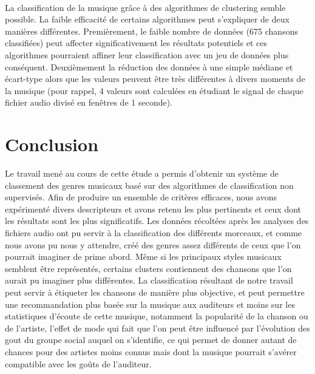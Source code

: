 \documentclass[soumission]{ir}
\begin{document}
\paragraph{}
La classification de la musique grâce à des algorithmes de clustering semble possible. La faible efficacité de 
certains algorithmes peut s’expliquer de deux manières différentes. Premièrement, le faible nombre de données 
(675 chansons classifiées) peut affecter significativement les résultats potentiels et ces algorithmes pourraient 
affiner leur classification avec un jeu de données plus conséquent. Deuxièmement la réduction des données à une 
simple médiane et écart-type alors que les valeurs peuvent être très différentes à divers moments de la musique 
(pour rappel, 4 valeurs sont calculées en étudiant le signal de chaque fichier audio divisé en fenêtres de 1 
seconde).

\section{Conclusion}
Le travail mené au cours de cette étude a permis d’obtenir un système de classement des genres musicaux basé sur 
des algorithmes de classification non supervisés. Afin de produire un ensemble de critères efficaces, nous avons 
expérimenté divers descripteurs et avons retenu les plus pertinents et ceux dont les résultats sont les plus 
significatifs.  Les données récoltées après les analyses des fichiers audio ont pu servir à la classification des 
différents morceaux, et comme nous avons pu nous y attendre, créé des genres assez différents de ceux que l’on 
pourrait imaginer de prime abord. Même si les principaux styles musicaux semblent être représentés, certains 
clusters contiennent des chansons que l’on aurait pu imaginer plus différentes. La classification résultant de 
notre travail peut servir à étiqueter les chansons de manière plus objective, et peut permettre une 
recommandation plus basée sur la musique aux auditeurs et moins sur les statistiques d’écoute de cette musique, 
notamment la popularité de la chanson ou de l’artiste, l’effet de mode qui fait que l’on peut être influencé par 
l’évolution des gout du groupe social auquel on s’identifie, ce qui permet de donner autant de chances pour des 
artistes moins connus mais dont la musique pourrait s’avérer compatible avec les goûts de l’auditeur.




\appendix
\end{document}
